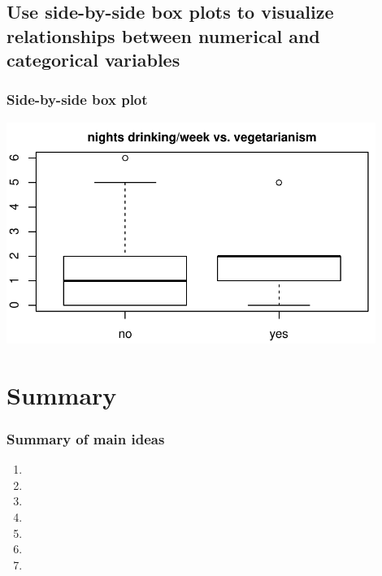 \documentclass[slidestop,compress,mathserif,12pt,t,professionalfonts,xcolor=table]{beamer}
\begin{document}

\subsection{Use side-by-side box plots to visualize relationships between numerical and categorical variables}
\label{mi7}


\begin{frame}[fragile]
\frametitle{Side-by-side box plot}


\begin{center}
\includegraphics[width=0.9\textwidth]{figures/survey/box_drinks_veg}
\end{center}


\end{frame}


\section{Summary}


\begin{frame}
\frametitle{Summary of main ideas}

\vfill

\begin{enumerate}

\item {}

\item {}

\item {}

\item {}

\item {}

\item {}

\item {}

\end{enumerate}

\vfill


\end{frame}

\end{document}
